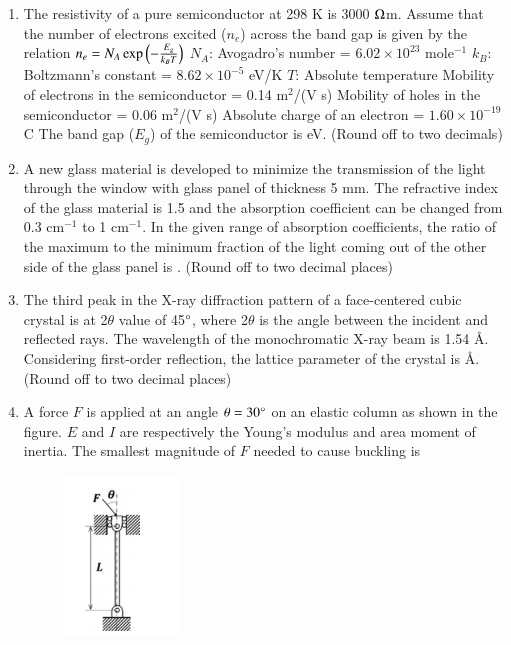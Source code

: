 \documentclass[a4paper,10pt]{article}
\begin{document}
\begin{enumerate}
\hfill{}

\item The resistivity of a pure semiconductor at 298 K is 3000 $\ohm$m. Assume that the number of electrons excited ($n_e$) across the band gap is given by the relation
$n_e = N_A \exp\left(-\frac{E_g}{k_B T}\right)$
$N_A$: Avogadro's number = $6.02 \times 10^{23}$ mole$^{-1}$
$k_B$: Boltzmann's constant = $8.62 \times 10^{-5}$ eV/K
$T$: Absolute temperature
Mobility of electrons in the semiconductor = 0.14 m$^2$/(V s)
Mobility of holes in the semiconductor = 0.06 m$^2$/(V s)
Absolute charge of an electron = $1.60 \times 10^{-19}$ C
The band gap ($E_g$) of the semiconductor is \underline{\hspace{2cm}} eV.
(Round off to two decimals)

\hfill{}

\item A new glass material is developed to minimize the transmission of the light through the window with glass panel of thickness 5 mm. The refractive index of the glass material is 1.5 and the absorption coefficient can be changed from 0.3 cm$^{-1}$ to 1 cm$^{-1}$. In the given range of absorption coefficients, the ratio of the maximum to the minimum fraction of the light coming out of the other side of the glass panel is \underline{\hspace{2cm}}. (Round off to two decimal places)

\hfill{}

\item The third peak in the X-ray diffraction pattern of a face-centered cubic crystal is at 2$\theta$ value of 45$\degree$, where 2$\theta$ is the angle between the incident and reflected rays. The wavelength of the monochromatic X-ray beam is 1.54 \AA. Considering first-order reflection, the lattice parameter of the crystal is \underline{\hspace{2cm}} \AA. (Round off to two decimal places)

\hfill{}

\item A force $F$ is applied at an angle $\theta = 30\degree$ on an elastic column as shown in the figure. $E$ and $I$ are respectively the Young's modulus and area moment of inertia. The smallest magnitude of $F$ needed to cause buckling is
\begin{figure}[H]
    \centering
    \includegraphics[width=0.2\columnwidth]{q66.png}
    \caption*{}
    \label{fig:q66}
\end{figure}


\end{enumerate}
\end{document}
